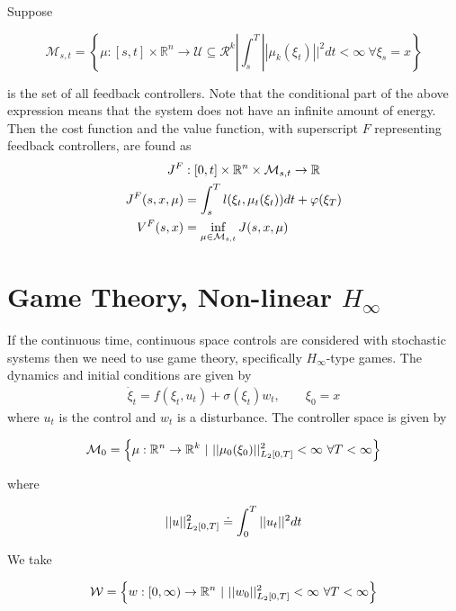 Suppose

\begin{equation*}
\mathcal{M}_{s,t} = \left\lbrace\mu:[s,t]\times\mathbb{R}^n\to\mathcal{U}\subseteq\mathcal{R}^k | \int_s^T||\mu_k(\xi_t)||^2dt<\infty~\forall \xi_s=x\right\rbrace
\end{equation*}

is the set of all feedback controllers.
Note that the conditional part of the above expression means that the system does not have an infinite amount of energy.
Then the cost function and the value function, with superscript $F$ representing feedback controllers, are found as
\begin{align*}
J^F&:[0,t]\times\mathbb{R}^n\times\mathcal{M}_{s,t}\to\mathbb{R} \\
J^F(s,x,\mu) &= \int_s^T l(\xi_t,\mu_t(\xi_t))dt + \varphi(\xi_T) \\
V^F(s,x) &= \inf_{\mu\in\mathcal{M}_{s,t}} J(s,x,\mu)
\end{align*}

\section{Game Theory, Non-linear $H_\infty$}
If the continuous time, continuous space controls are considered with stochastic systems then we need to use game theory, specifically $H_\infty$-type games.
The dynamics and initial conditions are given by
\begin{align*}
\dot{\xi}_t = f(\xi_t,u_t) + \sigma(\xi_t)w_t, \qquad \xi_0=x
\end{align*}
where $u_t$ is the control and $w_t$ is a disturbance.
The controller space is given by

\begin{equation*}
\mathcal{M}_0 = \left\lbrace \mu:\mathbb{R}^n\to\mathbb{R}^k~|~||\mu_0(\xi_0)||^2_{L_2[0,T]}<\infty~\forall T<\infty\right\rbrace
\end{equation*}

where

\begin{equation*}
||u||^2_{L_2[0,T]}\doteq\int_0^T||u_t||^2dt
\end{equation*}

We take

\begin{equation*}
\mathcal{W}=\left\lbrace w:[0,\infty)\to\mathbb{R}^n~|~||w_0||^2_{\lT}<\infty~\forall T<\infty \right\rbrace%
\end{equation*}


